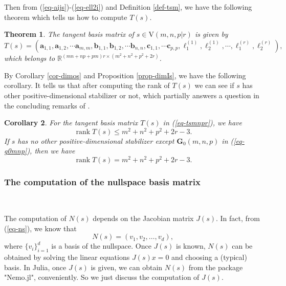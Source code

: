 \documentclass[reqno]{amsart}
\newtheorem{theorem}{Theorem}[section]
\newtheorem{corollary}[theorem]{Corollary}
\theoremstyle{definition}
\numberwithin{equation}{section}
\theoremstyle{remark}
\begin{document}
Then from (\ref{eq-aijs})-(\ref{eq-ell2i}) and Definition \ref{def-tsm},
we have the following theorem which tells us how to compute $T(s)$.
\begin{theorem}\label{thm-tbm}
The tangent basis matrix of $s\in \mathrm{V}(m,n,p|r)$ is given by
\begin{equation}\label{eq-tsmnpr}
T(s)=\left(\mathbf{a}_{1,1},\mathbf{a}_{1,2},\cdots \mathbf{a}_{m,m}, 
\mathbf{b}_{1,1},\mathbf{b}_{1,2},\cdots \mathbf{b}_{n,n},
\mathbf{c}_{1,1},\cdots \mathbf{c}_{p,p},
\ell_1^{(1)},\ell_2^{(1)}, \cdots, \ell_1^{(r)},\ell_2^{(r)} 
\right),
\end{equation}
which belongs to $\mathbb{R}^{(mn+np+pm)r\times (m^2+n^2+p^2+2r)}$.
\end{theorem}

By Corollary \ref{cor-dimos} and Proposition \ref{prop-dimIs}, we have the following corollary. It tells us that after computing the rank of $T(s)$ we can see if $s$ has other positive-dimensional stabilizer or not, which partially answers a question in the concluding remarks of \cite{li25loc}.
\begin{corollary}\label{prop-ranktsmnp}
For the tangent basis matrix $T(s)$ in (\ref{eq-tsmnpr}), we have
$$\operatorname{rank}T(s)\leq m^2+n^2+p^2+2r-3.$$
If $s$ has no other positive-dimensional stabilizer except $\mathbf{G}_0(m,n,p)$ in (\ref{eq-g0mnp}), then we have
$$\operatorname{rank}T(s)=m^2+n^2+p^2+2r-3.$$
\end{corollary}



\subsubsection{The computation of the nullspace basis matrix}
\

The computation of $N(s)$ depends on the Jacobian matrix $J(s)$. In fact,
from (\ref{eq-ns}), we know that
$$N(s)=(v_1,v_2,\ldots,v_d),$$
where $\{v_i\}_{i=1}^d$ is a basis of the nullspace.
Once $J(s)$ is known, $N(s)$ can be obtained by solving the linear equations $J(s)x=0$ and choosing a (typical) basis. In Julia, once $J(s)$ is given, we can obtain $N(s)$ from the package "Nemo.jl",  conveniently.
So we just discuss the computation of $J(s)$.
\end{document}
